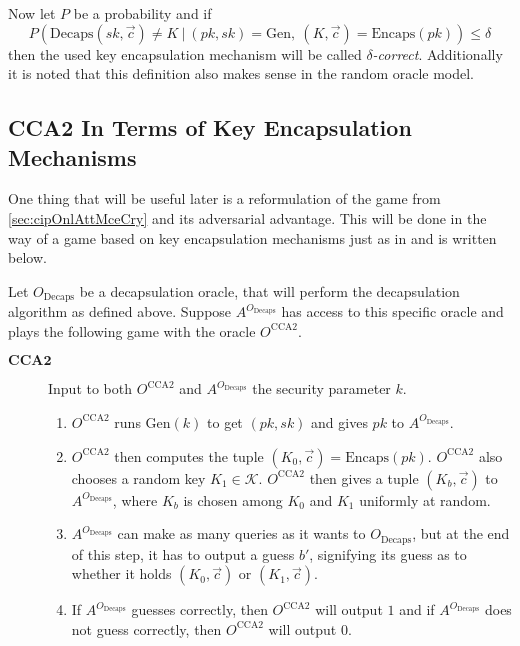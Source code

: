 Now let $P$ be a probability and if
\[
	P\left(\mathrm{Decaps}\left(sk,\vec{c}\right) \neq K \ \vert \ \left(pk,sk\right) = \mathrm{Gen}, \ \left(K,\vec{c}\right) = \mathrm{Encaps}\left(pk\right)\right) \leq \delta
\]
then the used key encapsulation mechanism will be called \emph{$\delta$-correct}. Additionally it is noted that this definition also makes sense in the random oracle model.



\subsection{CCA2 In Terms of Key Encapsulation Mechanisms}
\label{subsec:CCA2AsACodBasGam}

One thing that will be useful later is a reformulation of the game from \cref{sec:cipOnlAttMceCry} and its adversarial advantage. This will be done in the way of a game based on key encapsulation mechanisms just as in \cite{HHK} and is written below.

Let $O_{\mathrm{Decaps}}$ be a decapsulation oracle, that will perform the decapsulation algorithm as defined above. Suppose $A^{O_{\mathrm{Decaps}}}$ has access to this specific oracle and plays the following game with the oracle $O^{\mathrm{CCA}2}$.
\begin{description}
	\item[$\mathbf{CCA2}$] Input to both $O^{\mathrm{CCA}2}$ and $A^{O_{\mathrm{Decaps}}}$ the security parameter $k$.
		\begin{enumerate}
			\item $O^{\mathrm{CCA}2}$ runs $\mathrm{Gen}\left(k\right)$ to get $\left(pk, sk\right)$ and gives $pk$ to $A^{O_{\mathrm{Decaps}}}$.
			\item $O^{\mathrm{CCA}2}$ then computes the tuple $\left(K_0, \vec{c}\right) = \mathrm{Encaps}\left(pk\right)$. $O^{\mathrm{CCA}2}$ also chooses a random key $K_1 \in \mathcal{K}$. $O^{\mathrm{CCA}2}$ then gives a tuple $\left(K_b, \vec{c}\right)$ to $A^{O_{\mathrm{Decaps}}}$, where $K_b$ is chosen among $K_0$ and $K_1$ uniformly at random.
			\item $A^{O_{\mathrm{Decaps}}}$ can make as many queries as it wants to $O_{\mathrm{Decaps}}$, but at the end of this step, it has to output a guess $b'$, signifying its guess as to whether it holds $\left(K_0, \vec{c}\right)$ or $\left(K_1, \vec{c}\right)$.
			\item If $A^{O_{\mathrm{Decaps}}}$ guesses correctly, then $O^{\mathrm{CCA}2}$ will output $1$ and if $A^{O_{\mathrm{Decaps}}}$ does not guess correctly, then $O^{\mathrm{CCA}2}$ will output $0$.
		\end{enumerate}
\end{description}

